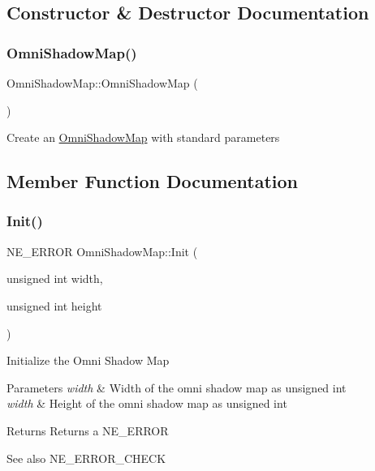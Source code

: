 \subsection{Constructor \& Destructor Documentation}
\mbox{\label{class_omni_shadow_map_a546a081c019229fec62b38f165b2f995}} 
\subsubsection{\texorpdfstring{OmniShadowMap()}{OmniShadowMap()}}
{\footnotesize\ttfamily Omni\+Shadow\+Map\+::\+Omni\+Shadow\+Map (\begin{DoxyParamCaption}{ }\end{DoxyParamCaption})}

Create an \mbox{\hyperlink{class_omni_shadow_map}{Omni\+Shadow\+Map}} with standard parameters 

\subsection{Member Function Documentation}
\mbox{\label{class_omni_shadow_map_a3236b048abb7375dc0d43852a37f4739}} 
\subsubsection{\texorpdfstring{Init()}{Init()}}
{\footnotesize\ttfamily N\+E\+\_\+\+E\+R\+R\+OR Omni\+Shadow\+Map\+::\+Init (\begin{DoxyParamCaption}\item[{unsigned int}]{width,  }\item[{unsigned int}]{height }\end{DoxyParamCaption})\hspace{0.3cm}{\ttfamily [virtual]}}

Initialize the Omni Shadow Map 
\begin{DoxyParams}{Parameters}
{\em width} & Width of the omni shadow map as unsigned int \\
\hline
{\em width} & Height of the omni shadow map as unsigned int \\
\hline
\end{DoxyParams}
\begin{DoxyReturn}{Returns}
Returns a N\+E\+\_\+\+E\+R\+R\+OR 
\end{DoxyReturn}
\begin{DoxySeeAlso}{See also}
N\+E\+\_\+\+E\+R\+R\+O\+R\+\_\+\+C\+H\+E\+CK 
\end{DoxySeeAlso}


